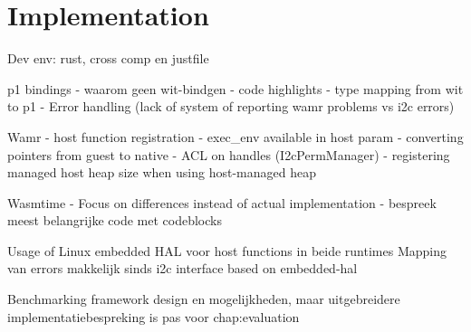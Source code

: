 \chapter{Implementation}
\label{chap:4}


Dev env: rust, cross comp en justfile

p1 bindings
- waarom geen wit-bindgen
- code highlights
- type mapping from wit to p1
- Error handling (lack of system of reporting wamr problems vs i2c errors)

Wamr
- host function registration
    - exec\_env available in host param
    - converting pointers from guest to native
- ACL on handles (I2cPermManager)
- registering managed host heap size when using host-managed heap

Wasmtime
- Focus on differences instead of actual implementation
- bespreek meest belangrijke code met codeblocks

Usage of Linux embedded HAL voor host functions in beide runtimes
Mapping van errors makkelijk sinds i2c interface based on embedded-hal

Benchmarking framework design en mogelijkheden, maar uitgebreidere implementatiebespreking is pas voor chap:evaluation